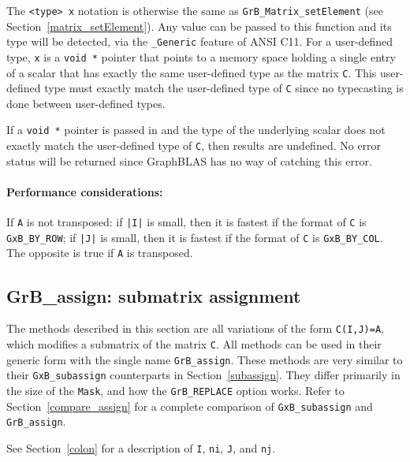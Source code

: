 \documentclass[12pt]{article}
\begin{document}
The \verb'<type> x' notation is otherwise the same as
\verb'GrB_Matrix_setElement' (see Section~\ref{matrix_setElement}).  Any value
can be passed to this function and its type will be detected, via the
\verb'_Generic' feature of ANSI C11.  For a user-defined type, \verb'x' is a
\verb'void *' pointer that points to a memory space holding a single entry of a
scalar that has exactly the same user-defined type as the matrix \verb'C'.
This user-defined type must exactly match the user-defined type of \verb'C'
since no typecasting is done between user-defined types.

If a \verb'void *' pointer is passed in and the type of the underlying scalar
does not exactly match the user-defined type of \verb'C', then results are
undefined.  No error status will be returned since GraphBLAS has no way of
catching this error.

\paragraph{\bf Performance considerations:} %
If \verb'A' is not transposed: if \verb'|I|' is small, then it is fastest if
the format of \verb'C' is \verb'GxB_BY_ROW'; if \verb'|J|' is small, then it is
fastest if the format of \verb'C' is \verb'GxB_BY_COL'.  The opposite is true
if \verb'A' is transposed.

\newpage
\subsection{{\sf GrB\_assign:} submatrix assignment} %
\label{assign}

The methods described in this section are all variations of the form
\verb'C(I,J)=A', which modifies a submatrix of the matrix \verb'C'.  All
methods can be used in their generic form with the single name
\verb'GrB_assign'.  These methods are very similar to their
\verb'GxB_subassign' counterparts in Section~\ref{subassign}.  They differ
primarily in the size of the \verb'Mask', and how the \verb'GrB_REPLACE' option
works.  Refer to Section~\ref{compare_assign} for a complete comparison of
\verb'GxB_subassign' and \verb'GrB_assign'.

See Section~\ref{colon} for a description of
\verb'I', \verb'ni', \verb'J', and \verb'nj'.
\end{document}
